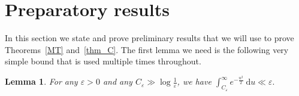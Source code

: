 \documentclass[letter,11pt]{article}
\theoremstyle{plain} %
\newtheorem{lemma}[theorem]{Lemma}
\theoremstyle{definition} %
\theoremstyle{plain}
\newcounter{MainTheoremCounter}
\newtheorem{maintheorem}[MainTheoremCounter]{Theorem}
\theoremstyle{plain}
\theoremstyle{plain}
\numberwithin{equation}{section}
\newcommand{\Matomaki}{Matom\"{a}ki}
\newcommand{\Radziwill}{Radziwi\l\l{}}
\newcommand{\N}{\mathbb{N}}
\newcommand{\C}{\mathbb{C}}
\renewcommand{\epsilon}{\varepsilon}
\renewcommand{\d}{~\mathrm{d}}
\newcommand{\Esub}[1]{\raisebox{-0.4ex}{\scalebox{1.4}[1.3]{$\mathbb{E}$}}\raisebox{-0.35ex}{\ensuremath{_{\scriptstyle #1}}}}
\newcommand{\1}{\mathbbm{1}}
\begin{document}






\section{Preparatory results}\label{prep_lemmas}

In this section we state and prove preliminary results that we will use to prove Theorems~\ref{MT} and~\ref{thm_C}.
The first lemma we need is the following very simple bound that is used multiple times throughout.
\begin{lemma}\label{int_bound}
    For any $\epsilon>0$ and any $C_\epsilon \gg \log\frac{1}{\epsilon}$, we have
    $\displaystyle\int_{C_\epsilon}^\infty e^{-\frac{u^2}{2}} \d u
    \ll \epsilon.$
\end{lemma}
\end{document}
